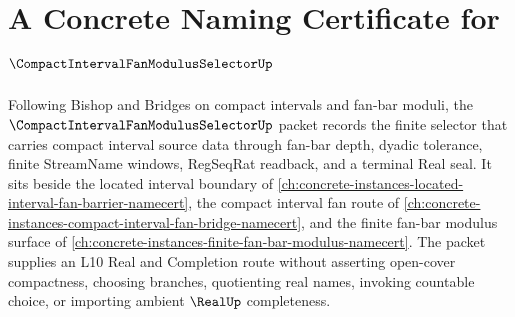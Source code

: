\chapter{A Concrete Naming Certificate for $\CompactIntervalFanModulusSelectorUp$}
\label{ch:concrete-instances-compact-interval-fan-modulus-selector-namecert}

Following Bishop and Bridges on compact intervals and fan-bar moduli, the $\CompactIntervalFanModulusSelectorUp$ packet records the finite selector that carries compact interval source data through fan-bar depth, dyadic tolerance, finite StreamName windows, RegSeqRat readback, and a terminal Real seal. It sits beside the located interval boundary of \autoref{ch:concrete-instances-located-interval-fan-barrier-namecert}, the compact interval fan route of \autoref{ch:concrete-instances-compact-interval-fan-bridge-namecert}, and the finite fan-bar modulus surface of \autoref{ch:concrete-instances-finite-fan-bar-modulus-namecert}. The packet supplies an L10 Real and Completion route without asserting open-cover compactness, choosing branches, quotienting real names, invoking countable choice, or importing ambient $\RealUp$ completeness.

